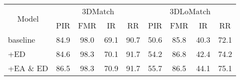 \begin{table}[htp]
	\renewcommand{\arraystretch}{1}
    \centering
    \label{tab:ablation_embedding}
    \wuhao
    \begin{tabular}{lcccccccc}
    \toprule[1.5pt]
    \multicolumn{1}{c}{\multirow{2}{*}{Model}}
    & \multicolumn{4}{c}{3DMatch}
    & \multicolumn{4}{c}{3DLoMatch} \\
    \multicolumn{1}{c}{}
    & PIR   & FMR   & IR    & RR   & PIR   & FMR   & IR    & RR    \\ \hline
    baseline
    & 84.9  & 98.0  & 69.1  & 90.7 & 50.6  & 85.8  & 40.3  & 72.1  \\ 
    +ED
    & 84.6  & 98.3  & 70.1  & 91.7 & 54.2  & 86.8  & 42.4  & 74.2  \\ 
    +EA \& ED
    & 86.5  & 98.3  & 70.9  & 91.7 & 55.7  & 86.5  & 44.1  & 75.1  \\
    \bottomrule[1.5pt]
    \end{tabular}
\end{table}